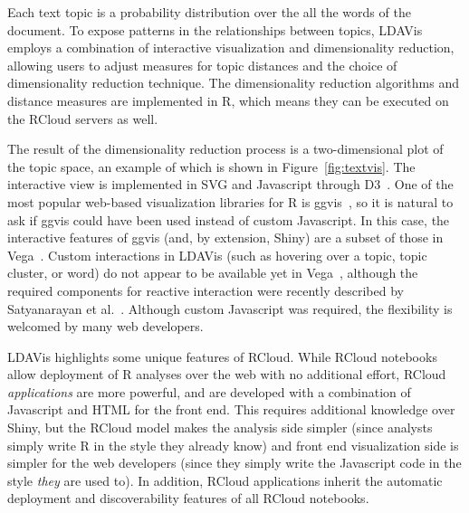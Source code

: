 Each text topic is a probability distribution over the all the
words of the document. To expose patterns in the relationships
between topics, LDAVis employs a combination of
interactive visualization and dimensionality reduction,
allowing users to adjust measures for topic distances and the choice
of dimensionality reduction technique. The dimensionality reduction
algorithms and distance measures are implemented in R, which
means they can be executed on the RCloud servers as well.

The result of the dimensionality reduction process is a
two-dimensional plot of the topic space, an example of which is shown in
Figure~\ref{fig:textvis}. The interactive view is implemented in SVG
and Javascript through D3~\cite{Bostock:2011:DDD}. One of the most
popular web-based visualization libraries for R is ggvis~\cite{ggvis},
so it is natural to ask if ggvis could have been used instead of
custom Javascript. In this case, the interactive features of ggvis
(and, by extension, Shiny) are a subset of those in Vega~\cite{vega}.
Custom interactions in LDAVis (such as hovering over a topic,
topic cluster, or word) do not appear to be available yet in Vega~\cite{vega},
although the required components for reactive interaction were
recently described by Satyanarayan et
al.~\cite{Satyanarayan:2014:DID}.
Although custom Javascript was required, the flexibility is welcomed
by many web developers.

LDAVis highlights some unique features of RCloud.
While RCloud notebooks allow deployment of R analyses over
the web with no additional effort, RCloud \emph{applications} are more
powerful, and are developed with a combination of Javascript and HTML
for the front end. This requires additional knowledge over Shiny, but
the RCloud model makes the analysis side simpler (since analysts
simply write R in the style they already know)
and front end visualization side is simpler for the web
developers (since they simply write the Javascript code in
the style \emph{they} are used to). In addition, RCloud applications
inherit the automatic deployment and discoverability features of
all RCloud notebooks.

%
